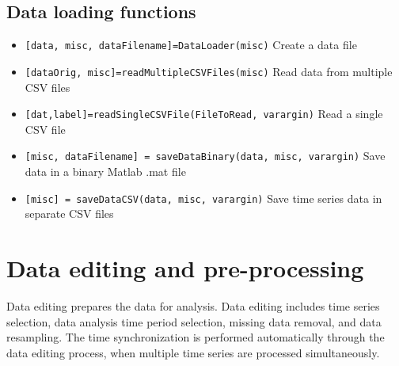 \documentclass{article}
\begin{document}
\subsection{Data loading functions}
\begin{itemize}
\item \lstinline![data, misc, dataFilename]=DataLoader(misc)! Create a data file
\item \lstinline![dataOrig, misc]=readMultipleCSVFiles(misc)!  Read data from multiple CSV files
\item \lstinline![dat,label]=readSingleCSVFile(FileToRead, varargin)! Read a single CSV file
\item \lstinline![misc, dataFilename] = saveDataBinary(data, misc, varargin)! Save data in a binary Matlab .mat file
\item \lstinline![misc] = saveDataCSV(data, misc, varargin)! Save time series data in separate CSV files
\end{itemize}

\section{Data editing and pre-processing}

Data editing prepares the data for analysis.
Data editing includes time series selection, data analysis time period selection, missing data removal, and data  resampling.
The time synchronization is performed automatically through the data editing process, when multiple time series are processed simultaneously.
\end{document}
